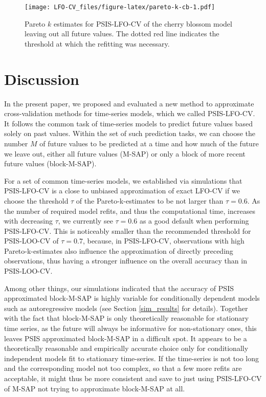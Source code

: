 \documentclass[american,]{article}
\begin{document}
\begin{figure}
\centering
\texttt{[image: LFO-CV\_files/figure-latex/pareto-k-cb-1.pdf]}
\caption{\label{fig:pareto-k-cb}Pareto \(k\) estimates for PSIS-LFO-CV of the cherry blossom model leaving out all future values. The dotted red line indicates the threshold at which the refitting was necessary.}
\end{figure}

\hypertarget{discussion}{%
\section{Discussion}\label{discussion}}

In the present paper, we proposed and evaluated a new method to approximate
cross-validation methods for time-series models, which we called PSIS-LFO-CV. It
follows the common task of time-series models to predict future values based
solely on past values. Within the set of such prediction tasks, we can choose
the number \(M\) of future values to be predicted at a time and how much of the
future we leave out, either all future values (M-SAP) or only a block of more
recent future values (block-M-SAP).

For a set of common time-series models, we established via simulations that
PSIS-LFO-CV is a close to unbiased approximation of exact LFO-CV if we choose
the threshold \(\tau\) of the Pareto-k-estimates to be not larger than \(\tau = 0.6\). As the number of required model refits, and thus the computational time,
increases with decreasing \(\tau\), we currently see \(\tau = 0.6\) as a good
default when performing PSIS-LFO-CV. This is noticeably smaller than the
recommended threshold for PSIS-LOO-CV of \(\tau = 0.7\), because, in PSIS-LFO-CV,
observations with high Pareto-k-estimates also influence the approximation of
directly preceding observations, thus having a stronger influence on the
overall accuracy than in PSIS-LOO-CV.

Among other things, our simulations indicated that the accuracy of PSIS
approximated block-M-SAP is highly variable for conditionally dependent
models such as autoregressive models (see Section \ref{sim_results} for
details). Together with the fact that block-M-SAP is only theoretically
reasonable for stationary time series, as the future will always be informative
for non-stationary ones, this leaves PSIS approximated block-M-SAP in a
difficult spot. It appears to be a theoretically reasonable and empirically
accurate choice only for conditionally independent models fit to stationary
time-series. If the time-series is not too long and the corresponding model not
too complex, so that a few more refits are acceptable, it might thus be more
consistent and save to just using PSIS-LFO-CV of M-SAP not trying to approximate
block-M-SAP at all.
\end{document}
